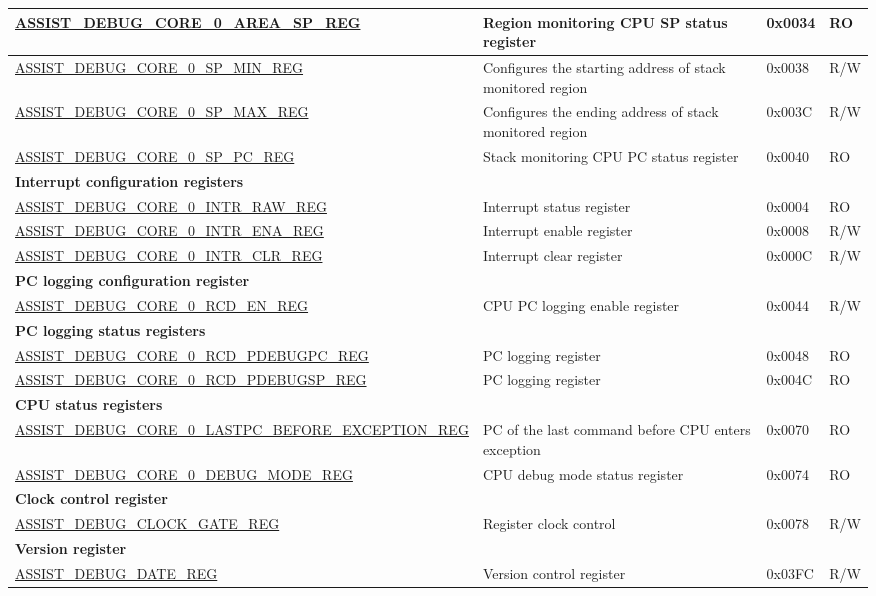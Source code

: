 \begin{longtable}{ | l| m{4cm} | l | l | }
\hyperref[regdesc:ASSISTDEBUGCORE0AREASPREG]{ASSIST\_DEBUG\_CORE\_0\_AREA\_SP\_REG} & Region monitoring CPU SP status register & 0x0034 & RO \\ \hline
\hyperref[regdesc:ASSISTDEBUGCORE0SPMINREG]{ASSIST\_DEBUG\_CORE\_0\_SP\_MIN\_REG} & Configures the starting address of stack monitored region & 0x0038 & R/W \\ \hline
\hyperref[regdesc:ASSISTDEBUGCORE0SPMAXREG]{ASSIST\_DEBUG\_CORE\_0\_SP\_MAX\_REG} & Configures the ending address of stack monitored region & 0x003C & R/W \\ \hline
\hyperref[regdesc:ASSISTDEBUGCORE0SPPCREG]{ASSIST\_DEBUG\_CORE\_0\_SP\_PC\_REG} & Stack monitoring CPU PC status register & 0x0040 & RO \\ \hline
\multicolumn{4}{|l|}{\textbf{Interrupt configuration registers}} \\ \hline
\hyperref[regdesc:ASSISTDEBUGCORE0INTRRAWREG]{ASSIST\_DEBUG\_CORE\_0\_INTR\_RAW\_REG} & Interrupt status register & 0x0004 & RO \\ \hline
\hyperref[regdesc:ASSISTDEBUGCORE0INTRENAREG]{ASSIST\_DEBUG\_CORE\_0\_INTR\_ENA\_REG} & Interrupt enable register & 0x0008 & R/W \\ \hline
\hyperref[regdesc:ASSISTDEBUGCORE0INTRCLRREG]{ASSIST\_DEBUG\_CORE\_0\_INTR\_CLR\_REG} & Interrupt clear register & 0x000C & R/W \\ \hline
\multicolumn{4}{|l|}{\textbf{PC logging configuration register}} \\ \hline
\hyperref[regdesc:ASSISTDEBUGCORE0RCDENREG]{ASSIST\_DEBUG\_CORE\_0\_RCD\_EN\_REG} & CPU PC logging enable register & 0x0044 & R/W \\ \hline
\multicolumn{4}{|l|}{\textbf{PC logging status registers}} \\ \hline
\hyperref[regdesc:ASSISTDEBUGCORE0RCDPDEBUGPCREG]{ASSIST\_DEBUG\_CORE\_0\_RCD\_PDEBUGPC\_REG} & PC logging register & 0x0048 & RO \\ \hline
\hyperref[regdesc:ASSISTDEBUGCORE0RCDPDEBUGSPREG]{ASSIST\_DEBUG\_CORE\_0\_RCD\_PDEBUGSP\_REG} & PC logging register & 0x004C & RO \\ \hline
\multicolumn{4}{|l|}{\textbf{CPU status registers}} \\ \hline
\hyperref[regdesc:ASSISTDEBUGCORE0LASTPCBEFOREEXCEPTIONREG]{ASSIST\_DEBUG\_CORE\_0\_LASTPC\_BEFORE\_EXCEPTION\_REG} & PC of the last command before CPU enters exception & 0x0070 & RO \\ \hline
\hyperref[regdesc:ASSISTDEBUGCORE0DEBUGMODEREG]{ASSIST\_DEBUG\_CORE\_0\_DEBUG\_MODE\_REG} & CPU debug mode status register & 0x0074 & RO \\ \hline
\multicolumn{4}{|l|}{\textbf{Clock control register}} \\ \hline
\hyperref[regdesc:ASSISTDEBUGCLOCKGATEREG]{ASSIST\_DEBUG\_CLOCK\_GATE\_REG} &  Register clock control & 0x0078 & R/W \\ \hline
\multicolumn{4}{|l|}{\textbf{Version register}} \\ \hline
\hyperref[regdesc:ASSISTDEBUGDATEREG]{ASSIST\_DEBUG\_DATE\_REG} & Version control register & 0x03FC & R/W \\ \hline
\end{longtable}